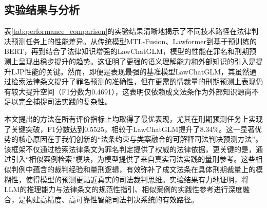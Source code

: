 \subsection{\heiti 实验结果与分析}


表\ref{tab:performance_comparison}的实验结果清晰地揭示了不同技术路径在法律判决预测任务上的性能差异。从传统模型MTL-Fusion、Lawformer到基于预训练的BERT，再到结合了法律知识增强的LawChatGLM，模型的性能在罪名和刑期预测上呈现出稳步提升的趋势。这证明了更强的语义理解能力和外部知识的引入是提升LJP性能的关键。然而，即便是表现最强的基准模型LawChatGLM，其虽然通过检索法律条文提升了罪名预测的准确性，但在更需酌情裁量的刑期预测上表现仍有较大提升空间（F1分数为0.4691），这表明仅依赖成文法条作为外部知识源尚不足以完全捕捉司法实践的复杂性。

本文提出的方法在所有评价指标上均取得了最优表现，尤其在刑期预测任务上实现了关键突破，F1分数达到0.5525，相较于LawChatGLM提升了8.34\%。这一显著优势的核心原因在于我们创新的“法条约束与类案融合的可解释司法判决预测方法”。该框架不仅通过检索法律条文为罪名判定提供了权威的法律依据，更关键的是，通过引入“相似案例检索”模块，为模型提供了来自真实司法实践的量刑参考。这些相似判例中蕴含的裁判经验和量刑逻辑，有效弥补了成文法条在具体刑期裁量上的模糊性，使得模型的预测更贴近真实的司法裁判思维。实验结果有力地证明，将LLM的推理能力与法律条文的规范性指引、相似案例的实践性参考进行深度融合，是构建高精度、高可靠性智能司法判决系统的有效路径。

